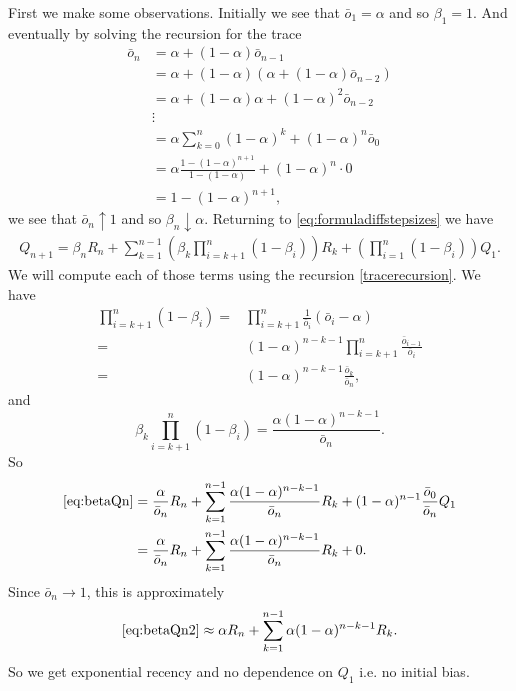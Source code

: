 \documentclass[answers]{exam}
\theoremstyle{definition}
\theoremstyle{remark}
\newenvironment{eqalign}{\begin{equation}\begin{aligned}}{\end{aligned}\end{equation}}
\begin{document}
\begin{solution}
First we make some observations. Initially we see that $\bar{o}_{1}=\alpha$ and so $\beta_{1}=1$. And eventually by solving the recursion for the trace
\begin{eqalign}
\bar{o}_{n}&=\alpha+(1-\alpha)\bar{o}_{n-1}\\
&=\alpha+(1-\alpha)(\alpha+(1-\alpha)\bar{o}_{n-2})\\
&=\alpha+(1-\alpha)\alpha+(1-\alpha)^{2}\bar{o}_{n-2}\\
&\vdots\\
&=\alpha\sum_{k=0}^{n}(1-\alpha)^{k}+(1-\alpha)^{n}\bar{o}_{0}\\
&=\alpha\frac{1-(1-\alpha)^{n+1}}{1-(1-\alpha)}+(1-\alpha)^{n}\cdot 0\\
&=1-(1-\alpha)^{n+1},
\end{eqalign}
we see that $\bar{o}_{n}\uparrow 1$ and so $\beta_{n}\downarrow \alpha$. Returning to \eqref{eq:formuladiffstepsizes} we have
\begin{eqalign}\label{eq:betaQn}
Q_{n+1}=\beta_{n}R_{n}+\sum_{k=1}^{n-1}(\beta_{k}\prod_{i=k+1}^{n}(1-\beta_{i}) )R_{k}   +(\prod_{i=1}^{n}(1-\beta_{i})) Q_{1}.
\end{eqalign}
We will compute each of those terms using the recursion \eqref{tracerecursion}. We have
\begin{eqalign}
\prod_{i=k+1}^{n}(1-\beta_{i}) =& \prod_{i=k+1}^{n}\frac{1}{\bar{o}_{i}}(\bar{o}_{i}-\alpha)   \\
 =& (1-\alpha)^{n-k-1}  \prod_{i=k+1}^{n}\frac{\bar{o}_{i-1} }{\bar{o}_{i}}\\
 =&(1-\alpha)^{n-k-1}  \frac{\bar{o}_{k} }{\bar{o}_{n}},
\end{eqalign}
and 
\begin{equation}
\beta_{k}\prod_{i=k+1}^{n}(1-\beta_{i})=\frac{\alpha(1-\alpha)^{n-k-1}  }{\bar{o}_{n}}.   
\end{equation}
So 
\begin{eqalign}\label{eq:betaQn2}
\eqref{eq:betaQn}&=\frac{\alpha}{\bar{o}_{n}} R_{n}+\sum_{k=1}^{n-1}\frac{\alpha(1-\alpha)^{n-k-1}  }{\bar{o}_{n}}R_{k}   +(1-\alpha)^{n-1}  \frac{\bar{o}_{0} }{\bar{o}_{n}} Q_{1}\\
&=\frac{\alpha}{\bar{o}_{n}} R_{n}+\sum_{k=1}^{n-1}\frac{\alpha(1-\alpha)^{n-k-1}  }{\bar{o}_{n}}R_{k}+0.
\end{eqalign}
Since $\bar{o}_{n}\to 1$, this is approximately 
\begin{eqalign}
\eqref{eq:betaQn2}\approx\alpha R_{n}+\sum_{k=1}^{n-1}\alpha(1-\alpha)^{n-k-1}  R_{k}.  
\end{eqalign}
So we get exponential recency and no dependence on $Q_{1}$ i.e. no initial bias.

\end{solution}
\end{document}
